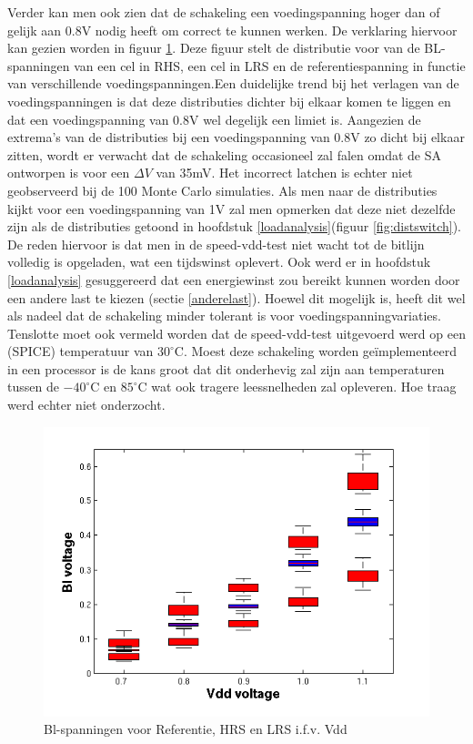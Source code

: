 Verder kan men ook zien dat de schakeling een voedingspanning hoger dan of gelijk aan 0.8V nodig heeft om correct te kunnen werken. De verklaring hiervoor kan gezien worden in figuur \ref{fig:vblvdd}. Deze figuur stelt de distributie voor van de BL-spanningen van een cel in RHS, een cel in LRS en de referentiespanning in functie van verschillende voedingspanningen.Een duidelijke trend bij het verlagen van de voedingspanningen  is dat deze distributies dichter bij elkaar komen te liggen en dat een voedingspanning van 0.8V wel degelijk een limiet is. Aangezien de extrema's van de distributies bij een voedingspanning van 0.8V zo dicht bij elkaar zitten, wordt er verwacht dat de schakeling occasioneel zal falen omdat de SA ontworpen is voor een $\Delta V$ van 35mV. Het incorrect latchen is echter niet geobserveerd bij de 100 Monte Carlo simulaties.
Als men naar de distributies kijkt voor een voedingspanning van 1V zal men opmerken dat deze niet dezelfde zijn als de distributies getoond in hoofdstuk \ref{loadanalysis}(figuur \ref{fig:distswitch}). De reden hiervoor is dat men in de speed-vdd-test niet wacht tot de bitlijn volledig is opgeladen, wat een tijdswinst oplevert. Ook werd er in hoofdstuk \ref{loadanalysis} gesuggereerd dat een energiewinst zou bereikt kunnen worden door een andere last te kiezen (sectie \ref{anderelast}). Hoewel dit mogelijk is, heeft dit wel als nadeel dat de schakeling minder tolerant is voor voedingspanningvariaties. Tenslotte moet ook vermeld worden dat de speed-vdd-test uitgevoerd werd op een (SPICE) temperatuur van $30^{\circ}\mathrm{C}$. Moest deze schakeling worden geïmplementeerd in een processor is de kans groot dat dit onderhevig zal zijn aan temperaturen tussen de $-40^{\circ}\mathrm{C}$ en $85^{\circ}\mathrm{C}$ wat ook tragere leessnelheden zal opleveren. Hoe traag werd echter niet onderzocht.

\begin{figure}[!ht]
  \centering
  \includegraphics[scale=0.8]{../fig/hfdst-final-vddbl.png}
  \caption[Bl-spanningen i.f.v. Vdd]{Bl-spanningen voor Referentie, HRS en LRS i.f.v. Vdd}
  \label{fig:vblvdd}
\end{figure}

